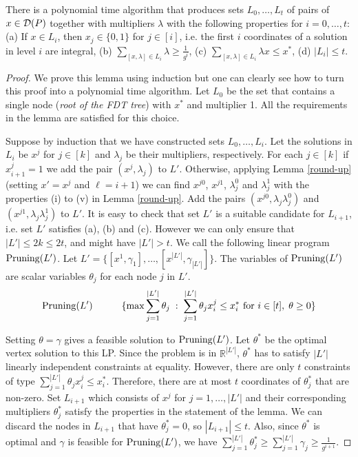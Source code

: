 \begin{lemma}\label{prune}
	There is a polynomial time algorithm that produces sets $L_0,\ldots,L_t$ of pairs of $x\in \operatorname{\mathcal{D}}(P)$ together with multipliers $\lambda$ with the following properties for $i=0,\ldots,t$:
	(a) If $x\in L_i$, then $x_j \in \{0,1\}$ for $j\in [i]$, i.e. the first $i$ coordinates of a solution in level $i$ are integral, (b) $\sum_{[x,\lambda]\in L_i} \lambda\geq\frac{1}{g^i}$, (c) $\sum_{[x,\lambda]\in L_i}\lambda x \leq x^*$, (d) $|L_i|\leq t$.
\end{lemma}
\begin{proof}
	We prove this lemma using induction but one can clearly see how to turn this proof into a polynomial time algorithm. Let $L_0$ be the set that contains a single node (\textit{root of the FDT tree}) with $x^*$ and multiplier 1. All the requirements in the lemma are satisfied for this choice.
	
	Suppose by induction that we have constructed sets $L_0,\ldots,L_i$. Let the solutions in $L_i$ be $x^j$ for $j\in [k]$ and $\lambda_j$ be their multipliers, respectively. For each $j\in[k]$ if $x^j_{i+1}=1$ we add the pair $(x^j,\lambda_j)$ to $L'$. Otherwise,	applying Lemma \ref{round-up} (setting $x'= x^j$ and $\ell = i+1$) we can find $x^{j0}$, $x^{j1}$, $\lambda^0_j$ and $\lambda^1_j$ with the properties (i) to (v) in Lemma \ref{round-up}. Add the pairs  $(x^{j0} ,\lambda_j\lambda^0_j)$ and  $(x^{j1} ,\lambda_j\lambda^1_j)$ to $L'$. It is easy to check that set $L'$ is a suitable candidate for $L_{i+1}$, i.e. set $L'$ satisfies (a), (b) and (c). However we can only ensure that $|L'|\leq 2k\leq 2t$, and might have $|L'|>t$. We call the following linear program $\operatorname{{{Pruning}}}(L')$. Let $L' = \{[x^1,\gamma_1],\ldots,[x^{|L'|},\gamma_{|L'|}]\}$. The variables of $\operatorname{{{Pruning}}}(L')$ are scalar variables $\theta_j$ for each node $j$ in $L'$.  
		\begin{equation}
		\operatorname{{{Pruning}}}(L')\quad\quad\quad \{\max \sum_{j=1}^{|L'|} \theta_j\;:\; \sum_{j=1}^{|L'|} \theta_j x^j_i\leq x^*_i \mbox{ for $i\in [t]$},\; \theta\geq 0 \}
		\end{equation}
		
		Setting $\theta = \gamma$ gives a feasible solution to $\operatorname{{{Pruning}}}(L')$. Let $\theta^*$ be the optimal vertex solution to this LP. Since the problem is in $\mathbb{R}^{|L'|}$,  $\theta^*$ has to satisfy $|L'|$ linearly independent constraints at equality. However, there are only $t$ constraints of type $ \sum_{j=1}^{|L'|} \theta_j x^j_i\leq x^*_i$. Therefore, there are at most $t$ coordinates of $\theta^*_j$ that are non-zero. Set $L_{i+1}$ which consists of $x^j$ for $j=1,\ldots,|L'|$ and their corresponding multipliers $\theta^*_j$ satisfy the properties in the statement of the lemma. We can discard the nodes in $L_{i+1}$ that have $\theta^*_j=0$, so $|L_{i+1}| \leq t$. Also, since $\theta^*$ is optimal and $\gamma$ is feasible for $\operatorname{{{Pruning}}}(L')$, we have $\sum_{j=1}^{|L'|} \theta^*_j \geq \sum_{j=1}^{|L'|}\gamma_j \geq \frac{1}{g^{i+1}}$. \end{proof}
	

